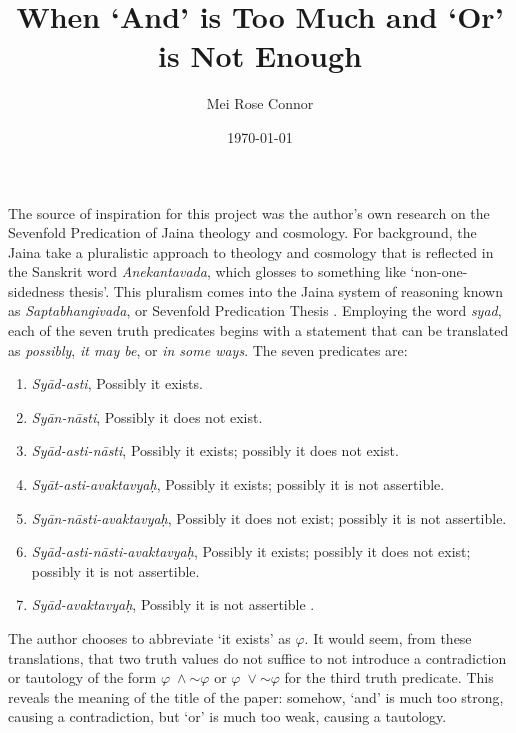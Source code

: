 \documentclass[12pt]{article}
\renewcommand{\phi}{\varphi}
\newcommand{\lognot}{\ensuremath{\sim \!}}
\begin{document}
\title{When `And' is Too Much and `Or' is Not Enough}
\author{Mei Rose Connor}
\date{\today}

\maketitle

The source of inspiration for this project was the author's own research on the Sevenfold Predication of Jaina theology and cosmology. For background,
the Jaina take a pluralistic approach to theology and cosmology that is reflected in the Sanskrit word \emph{Anekantavada}, which glosses to something like `non-one-sidedness
thesis'. This pluralism comes into the Jaina system of reasoning known as \emph{Saptabhangivada}, or Sevenfold Predication Thesis \cite{Burch1964}. Employing the word \emph{syad}, each of the
seven truth predicates begins with a statement that can be translated as \emph{possibly}, \emph{it may be}, or \emph{in some ways}. The seven predicates are:

\begin{enumerate}[noitemsep]
    \item \emph{Syād-asti}, Possibly it exists.
    \item \emph{Syān-nāsti}, Possibly it does not exist.
    \item \emph{Syād-asti-nāsti}, Possibly it exists; possibly it does not exist.
    \item \emph{Syāt-asti-avaktavya\d{h}}, Possibly it exists; possibly it is not assertible.
    \item \emph{Syān-nāsti-avaktavya\d{h}}, Possibly it does not exist; possibly it is not assertible.
    \item \emph{Syād-asti-nāsti-avaktavya\d{h}}, Possibly it exists; possibly it does not exist; possibly it is not assertible.
    \item \emph{Syād-avaktavya\d{h}}, Possibly it is not assertible \cite{Ganeri2002}.
\end{enumerate}


The author chooses to abbreviate `it exists' as $\phi$.
It would seem, from these translations, that two truth values do not suffice to not introduce a contradiction or 
tautology of the form $\phi \; \wedge \lognot \phi$ or  $\phi \; \vee \lognot \phi$ for the third truth predicate.  This reveals the meaning of the title of the paper: somehow,
`and' is much too strong, causing a contradiction, but `or' is much too weak, causing a tautology. 
\end{document}
